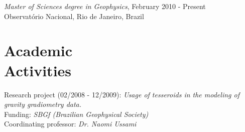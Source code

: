 \documentclass[margin,line]{resume}
\begin{document}
\begin{resume}
\begin{list1}
        \item[] \textit{Master of Sciences degree in Geophysics}, February 2010 - Present\\
        Observatório Nacional, Rio de Janeiro, Brazil\vspace{2mm}%

        \end{list1}







		\section{\mysidestyle Academic\\Activities}
		
		\begin{list1}
		
		\item[] Research project (02/2008 - 12/2009): \textit{Usage of tesseroids in the modeling of gravity gradiometry data.}\\
						Funding: \textit{SBGf (Brazilian Geophysical Society)}\\
						Coordinating professor: \textit{Dr. Naomi Ussami}\\


\end{list1}
\end{resume}
\end{document}
